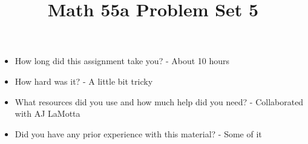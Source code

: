 \documentclass[11pt,letterpaper]{article}
\title{\textbf{Math 55a Problem Set 5}}
\begin{document}
\maketitle
\setcounter{page}{0}
\thispagestyle{empty}

\begin{itemize}
  \item How long did this assignment take you? - About 10 hours
  \item How hard was it? - A little bit tricky
  \item What resources did you use and how much help did you need? - Collaborated with AJ LaMotta
  \item Did you have any prior experience with this material? - Some of it
\end{itemize}

\pagebreak


\pagebreak


\pagebreak


\pagebreak


\pagebreak


\pagebreak


\pagebreak


\pagebreak


\pagebreak


\pagebreak

\end{document}
